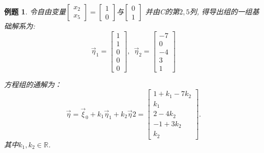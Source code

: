\documentclass[a4paper]{book}
\newtheorem{eg}{例题}[chapter]
\begin{document}
\begin{eg}
令自由变量$\begin{bmatrix}x_2\\ x_5\end{bmatrix}=\begin{bmatrix}1\\0\end{bmatrix}$与$\begin{bmatrix}0\\1\end{bmatrix}$ 并由C的第$2,5$列, 得导出组的一组基础解系为:
\begin{displaymath}
\vec{\eta}_1=\begin{bmatrix}1\\1\\0\\0\\0\end{bmatrix},\ \ \vec{\eta}_2=\begin{bmatrix}-7\\0\\-4\\3\\1\end{bmatrix}
\end{displaymath}

方程组的通解为：
\begin{displaymath}
\vec{\eta}=\vec{\xi}_0+k_1\vec{\eta}_1+k_2\vec{\eta}2=\begin{bmatrix}
1+k_1-7k_2\\k_1\\2-4k_2\\-1+3k_2\\k_2\end{bmatrix}.
\end{displaymath}
其中$k_1,k_2\in\mathbb{R}$.

\end{eg}
\end{document}
